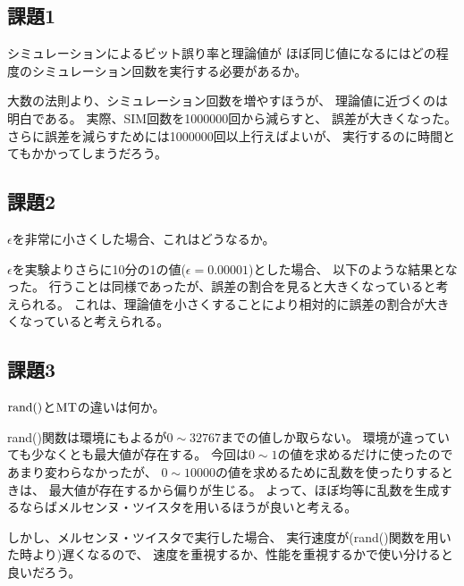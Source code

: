 \documentclass[12pt]{jarticle}
\begin{document}
\subsection{課題1}
\begin{shadebox}
    シミュレーションによるビット誤り率と理論値が
    ほぼ同じ値になるにはどの程度のシミュレーション回数を実行する必要があるか。
\end{shadebox}

大数の法則より、シミュレーション回数を増やすほうが、
理論値に近づくのは明白である。
実際、SIM回数を1000000回から減らすと、
誤差が大きくなった。
さらに誤差を減らすためには1000000回以上行えばよいが、
実行するのに時間とてもかかってしまうだろう。

\subsection{課題2}
\begin{shadebox}
    $\epsilon$を非常に小さくした場合、これはどうなるか。
\end{shadebox}

$\epsilon$を実験よりさらに10分の1の値($\epsilon=0.00001$)とした場合、
以下のような結果となった。
行うことは同様であったが、誤差の割合を見ると大きくなっていると考えられる。
これは、理論値を小さくすることにより相対的に誤差の割合が大きくなっていると考えられる。


\clearpage

\subsection{課題3}
\begin{shadebox}
    $\rm{rand()}$と$\rm{MT}$の違いは何か。
\end{shadebox}

rand()関数は環境にもよるが$0\sim 32767$までの値しか取らない。
環境が違っていても少なくとも最大値が存在する。
今回は$0\sim 1$の値を求めるだけに使ったのであまり変わらなかったが、
$0\sim 10000$の値を求めるために乱数を使ったりするときは、
最大値が存在するから偏りが生じる。
よって、ほぼ均等に乱数を生成するならばメルセンヌ・ツイスタを用いるほうが良いと考える。

しかし、メルセンヌ・ツイスタで実行した場合、
実行速度が(rand()関数を用いた時より)遅くなるので、
速度を重視するか、性能を重視するかで使い分けると良いだろう。

\clearpage
\appendix
\end{document}
